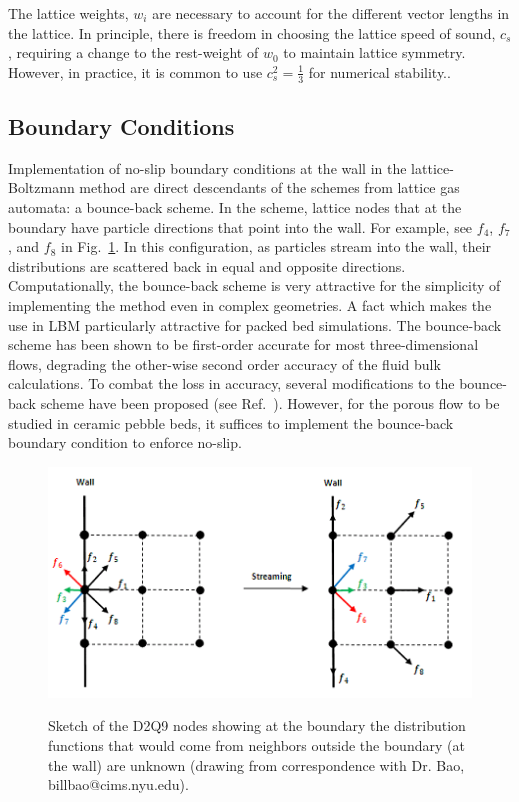 The lattice weights, $w_i$ are necessary to account for the different vector lengths in the lattice. In principle, there is freedom in choosing the lattice speed of sound, $c_s$, requiring a change to the rest-weight of $w_0$ to maintain lattice symmetry. However, in practice, it is common to use $c_s^2 = \frac{1}{3}$ for numerical stability.\cite{Latt2007,succi2001lattice}.




\subsection{Boundary Conditions}
Implementation of no-slip boundary conditions at the wall in the lattice-Boltzmann method are direct descendants of the schemes from lattice gas automata: a bounce-back scheme. In the scheme, lattice nodes that at the boundary have particle directions that point into the wall. For example, see $f_4$, $f_7$, and $f_8$ in Fig.~\ref{fig:wall-lattice-bc}. In this configuration, as particles stream into the wall, their distributions are scattered back in equal and opposite directions. Computationally, the bounce-back scheme is very attractive for the simplicity of implementing the method even in complex geometries. A fact which makes the use in LBM particularly attractive for packed bed simulations.\cite{Chen1998a} The bounce-back scheme has been shown to be first-order accurate for most three-dimensional flows, degrading the other-wise second order accuracy of the fluid bulk calculations.\cite{Zou1997,Chen1998a} To combat the loss in accuracy, several modifications to the bounce-back scheme have been proposed (see Ref.~\cite{Chen1998a}). However, for the porous flow to be studied in ceramic pebble beds, it suffices to implement the bounce-back boundary condition to enforce no-slip.\cite{Chen1998a,Luo2003a}

\begin{figure}[t]
	\centering
	\includegraphics[width=\singleimagewidth]{chapters/figures/lbm/ongrid}\label{fig:wall-lattice-bc}
	\caption{Sketch of the D2Q9 nodes showing at the boundary the distribution functions that would come from neighbors outside the boundary (at the wall) are unknown (drawing from correspondence with Dr. Bao, billbao@cims.nyu.edu).}
\end{figure}


